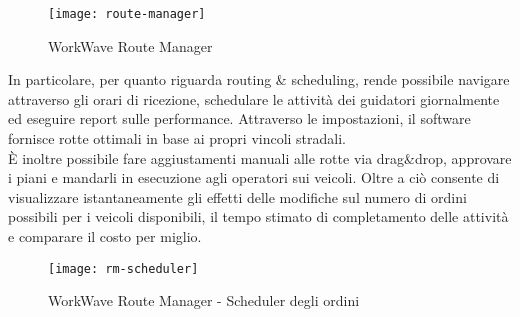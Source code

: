 \begin{figure}[H] 
  \centering 
  \texttt{[image: route-manager]} 
  \caption{WorkWave Route Manager}
\end{figure}

In particolare, per quanto riguarda routing \& scheduling, rende possibile navigare attraverso gli orari di ricezione, schedulare le attività dei guidatori giornalmente ed eseguire report sulle performance. Attraverso le impostazioni, il software fornisce rotte ottimali in base ai propri vincoli stradali. \\

È inoltre possibile fare aggiustamenti manuali alle rotte via drag\&drop, approvare i piani e mandarli in esecuzione agli operatori sui veicoli. Oltre a ciò consente di visualizzare istantaneamente gli effetti delle modifiche sul numero di ordini possibili per i veicoli disponibili, il tempo stimato di completamento delle attività e comparare il costo per miglio.

\begin{figure}[H] 
  \centering 
  \texttt{[image: rm-scheduler]} 
  \caption{WorkWave Route Manager - Scheduler degli ordini}
\end{figure}
